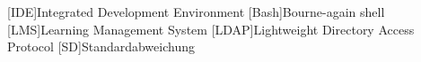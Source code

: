 
\begin{acronym}[Bash]
    [IDE]{Integrated Development Environment}
    [Bash]{Bourne-again shell}
    [LMS]{Learning Management System}
    [LDAP]{Lightweight Directory Access Protocol}
    [SD]{Standardabweichung}
\end{acronym}